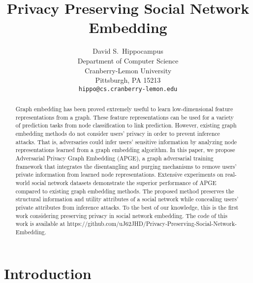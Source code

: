 \documentclass{article}
\title{Privacy Preserving Social Network Embedding}
\author{%
  David S.~Hippocampus \\
  Department of Computer Science\\
  Cranberry-Lemon University\\
  Pittsburgh, PA 15213 \\
  \texttt{hippo@cs.cranberry-lemon.edu} \\
}
\begin{document}
\maketitle

\begin{abstract}
Graph embedding has been proved extremely useful to learn low-dimensional feature representations from a graph. These feature representations can be used for a variety of prediction tasks from node classification to link prediction. However, existing graph embedding methods do not consider users' privacy in order to prevent inference attacks. That is, adversaries could infer users' sensitive information by analyzing node representations learned from a graph embedding algorithm. In this paper, we propose Adversarial Privacy Graph Embedding (APGE), a graph adversarial training framework that integrates the disentangling and purging mechanisms to remove users' private information from learned node representations. Extensive experiments on real-world social network datasets demonstrate the superior performance of APGE compared to existing graph embedding methods. The proposed method preserves the structural information and utility attributes of a social network while concealing users' private attributes from inference attacks. To the best of our knowledge, this is the first work considering preserving privacy in social network embedding. The code of this work is available at https://github.com/uJ62JHD/Privacy-Preserving-Social-Network-Embedding.
\end{abstract}


\section{Introduction}
\end{document}
